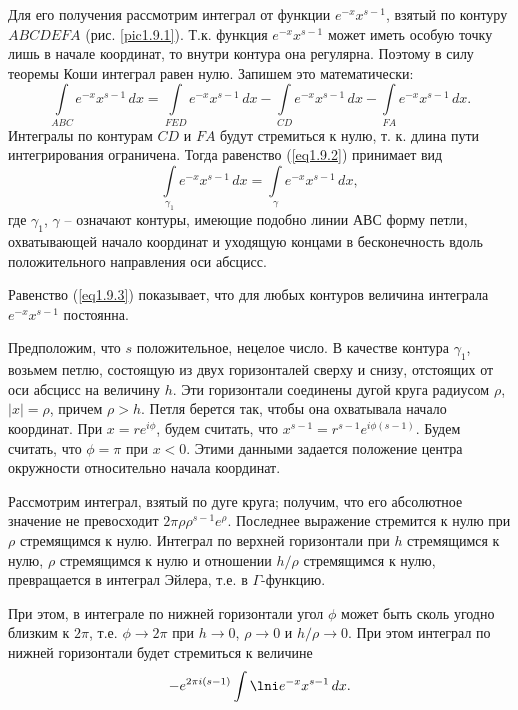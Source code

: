 Для его получения рассмотрим интеграл от функции \( e^{-x}x^{s-1} \), взятый
по контуру \( ABCDEFA \) (рис. \ref{pic1.9.1}). Т.к. функция \( e^{-x}x^{s-1} \)
может иметь особую точку лишь в начале координат, то внутри контура она
регулярна. Поэтому в силу теоремы Коши интеграл равен нулю.
Запишем это математически:
\begin{equation}
    \int\limits_{ABC} e^{-x}x^{s-1}\,dx = \int\limits_{FED} e^{-x}x^{s-1}\,dx -
    \int\limits_{CD} e^{-x}x^{s-1}\,dx - \int\limits_{FA} e^{-x}x^{s-1}\,dx.
    \label{eq1.9.2}
\end{equation}
Интегралы по контурам \( CD \) и \( FA \) будут стремиться к нулю, т. к. длина
пути интегрирования ограничена. Тогда равенство (\ref{eq1.9.2}) принимает вид
\begin{equation}
    \int\limits_{\gamma_1} e^{-x}x^{s-1}\,dx =
    \int\limits_\gamma e^{-x}x^{s-1}\,dx,
    \label{eq1.9.3}
\end{equation}
где \( \gamma_1 \), \( \gamma \) -- означают контуры, имеющие подобно линии
\( АВС \) форму петли, охватывающей начало координат и уходящую концами в
бесконечность вдоль положительного направления оси абсцисс.

Равенство (\ref{eq1.9.3}) показывает, что для любых контуров величина интеграла
\( e^{-x}x^{s-1} \) постоянна.

Предположим, что \( s \) положительное, нецелое число. В качестве контура
\( \gamma_1 \), возьмем петлю, состоящую из двух горизонталей сверху и снизу,
отстоящих от оси абсцисс на величину \( h \). Эти горизонтали соединены дугой
круга радиусом \( \rho \), \( |x| = \rho \), причем \( \rho > h \). Петля
берется так, чтобы она охватывала начало координат. При \( x = re^{i\phi} \),
будем считать, что \( x^{s-1} = r^{s-1}e^{i\phi(s-1)} \). Будем считать, что
\( \phi = \pi \) при \( x < 0 \). Этими данными задается положение центра
окружности относительно начала координат.

Рассмотрим интеграл, взятый по дуге круга; получим, что его абсолютное значение
не превосходит \( 2\pi\rho\rho^{s-1}e^\rho \). Последнее выражение стремится к
нулю при \( \rho \) стремящимся к нулю. Интеграл по верхней горизонтали при
\( h \) стремящимся к нулю, \( \rho \) стремящимся к нулю и отношении
\( h/\rho \) стремящимся к нулю, превращается в интеграл Эйлера, т.е. в
\( \Gamma \)-функцию.

При этом, в интеграле по нижней горизонтали угол \( \phi \) может быть сколь
угодно близким к \( 2\pi \), т.е. \( \phi\to2\pi \) при \( h\to0 \),
\( \rho\to0\) и \(h/\rho \to 0 \). При этом интеграл по нижней горизонтали будет
стремиться к величине
\[
    -e^{2\pi i(s-1)} \int\lni e^{-x}x^{s-1}\,dx.
\]

